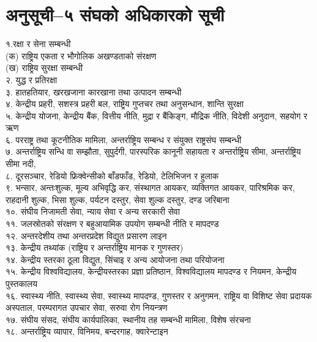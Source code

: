 \section{अनुसूची–५ संघको अधिकारको सूची}

१.रक्षा र सेना सम्बन्धी\\
(क) राष्ट्रिय एकता र भौगोलिक अखण्डताको संरक्षण\\
(ख) राष्ट्रिय सुरक्षा सम्बन्धी\\
२. युद्ध र प्रतिरक्षा\\
३. हातहतियार, खरखजाना कारखाना तथा उत्पादन सम्बन्धी\\
४. केन्द्रीय प्रहरी, सशस्त्र प्रहरी बल, राष्ट्रिय गुप्तचर तथा अनुसन्धान, शान्ति सुरक्षा\\
५. केन्द्रीय योजना, केन्द्रीय बैंक, वित्तीय नीति, मुद्रा र बैंकिङ्ग, मौद्रिक नीति, विदेशी अनुदान, सहयोग र ऋण\\
६. परराष्ट्र तथा कूटनीतिक मामिला, अन्तर्राष्ट्रिय सम्बन्ध र संयुक्त राष्ट्रसंघ सम्बन्धी\\
७. अन्तर्राष्ट्रिय सन्धि वा सम्झौता, सुपुर्दगी, पारस्परिक कानूनी सहायता र अन्तर्राष्ट्रिय सीमा, अन्तर्राष्ट्रिय सीमा नदी,\\
८. दूरसञ्चार, रेडियो फ्रिक्वेन्सीको बाँडफाँड, रेडियो, टेलिभिजन र हुलाक\\
९. भन्सार, अन्तःशुल्क, मूल्य अभिवृद्धि कर, संस्थागत आयकर, व्यक्तिगत आयकर, पारिश्रमिक कर, राहदानी शुल्क, भिसा शुल्क, पर्यटन दस्तुर, सेवा शुल्क दस्तुर, दण्ड जरिबाना\\
१०. संघीय निजामती सेवा, न्याय सेवा र अन्य सरकारी सेवा\\
११. जलस्रोतको संरक्षण र बहुआयामिक उपयोग सम्बन्धी नीति र मापदण्ड\\
१२. अन्तरदेशीय तथा अन्तरप्रदेश विद्युत प्रसारण लाइन\\
१३. केन्द्रीय तथ्यांक (राष्ट्रिय र अन्तर्राष्ट्रिय मानक र गुणस्तर)\\
१४. केन्द्रीय स्तरका ठूला विद्युत, सिंचाइ र अन्य आयोजना तथा परियोजना\\
१५. केन्द्रीय विश्वविद्यालय, केन्द्रीयस्तरका प्रज्ञा प्रतिष्ठान, विश्वविद्यालय मापदण्ड र नियमन, केन्द्रीय पुस्तकालय\\
१६. स्वास्थ्य नीति, स्वास्थ्य सेवा, स्वास्थ्य मापदण्ड, गुणस्तर र अनुगमन, राष्ट्रिय वा विशिष्ट सेवा प्रदायक अस्पताल, परम्परागत उपचार सेवा, सरुवा रोग नियन्त्रण\\
१७. संघीय संसद, संघीय कार्यपालिका, स्थानीय तह सम्बन्धी मामिला, विशेष संरचना\\
१८. अन्तर्राष्ट्रिय व्यापार, विनिमय, बन्दरगाह, क्वारेन्टाइन\\
